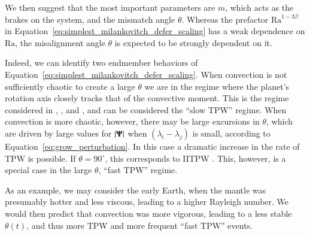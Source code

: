 \documentclass[preprint,12pt,authoryear]{elsarticle}
\newcommand{\mitbf}[1]{\hbox{\mathversion{bold}$#1$}}
\begin{document}
We then suggest that the most important parameters are $m$, which acts as the brakes on the system, and the mismatch angle $\theta$.
Whereas the prefactor $\mathrm{Ra}^{1-3\beta}$ in Equation~\eqref{eq:simplest_milankovitch_defer_scaling} has a weak dependence on $\mathrm{Ra}$, 
the misalignment angle $\theta$ is expected to be strongly dependent on it.

Indeed, we can identify two endmember behaviors of Equation~\eqref{eq:simplest_milankovitch_defer_scaling}.
When convection is not sufficiently chaotic to create a large $\theta$ we are in the regime where the planet's rotation axis closely tracks that of the convective moment.
This is the regime considered in \citet{steinberger1997changes}, \citet{roberts2007cause}, and \citet{zhong2007supercontinent}, and can be considered the ``slow TPW'' regime.
When convection is more chaotic, however, there may be large excursions in $\theta$, 
which are driven by large values for $|\mitbf{\Psi}|$ when $(\lambda_i - \lambda_j)$ is small, according to Equation~\eqref{eq:grow_perturbation}. 
In this case a dramatic increase in the rate of TPW is possible.
If $\theta=90^\circ$, this corresponds to IITPW \citep{kirschvink1997evidence}.  
This, however, is a special case in the large $\theta$, ``fast TPW'' regime.

As an example, we may consider the early Earth, when the mantle was presumably hotter and less viscous, leading to a 
higher Rayleigh number. We would then predict that convection was more vigorous, leading to 
a less stable $\theta(t)$, and thus more TPW and more frequent ``fast TPW'' events.
\end{document}
